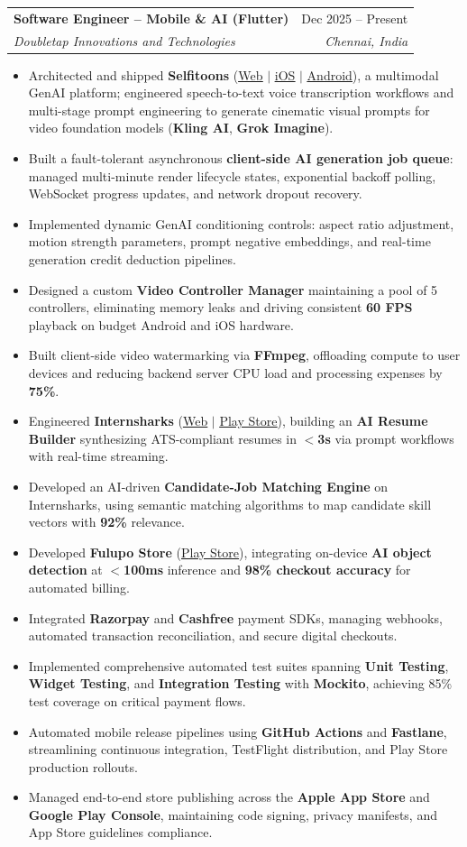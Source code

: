 \documentclass[letterpaper,10pt]{article}
\makeatletter
\newcommand{\resumeItem}[1]{
  \item\small{
    {#1 \vspace{-2pt}}
  }
}
\newcommand{\resumeSubheading}[4]{
  \vspace{-2pt}\item
    \begin{tabular*}{0.97\textwidth}[t]{l@{\extracolsep{\fill}}r}
      \textbf{#1} & #2 \\
      \textit{\small#3} & \textit{\small #4} \\
    \end{tabular*}\vspace{-6pt}
}
\newcommand{\resumeItemListStart}{\begin{itemize}[leftmargin=0.15in]}
\newcommand{\resumeItemListEnd}{\end{itemize}\vspace{-4pt}}
\makeatother
\begin{document}
    \resumeSubheading
      {Software Engineer -- Mobile \& AI (Flutter)}{Dec 2025 -- Present}
      {Doubletap Innovations and Technologies}{Chennai, India}
      \resumeItemListStart
        \resumeItem{Architected and shipped \textbf{Selfitoons} (\href{https://selfitoons.ai/}{\underline{Web}} $|$ \href{https://apps.apple.com/in/app/selfitoons/id6758597947}{\underline{iOS}} $|$ \href{https://play.google.com/store/apps/details?id=com.doubletap.ai.selfitoons}{\underline{Android}}), a multimodal GenAI platform; engineered speech-to-text voice transcription workflows and multi-stage prompt engineering to generate cinematic visual prompts for video foundation models (\textbf{Kling AI}, \textbf{Grok Imagine}).}
        \resumeItem{Built a fault-tolerant asynchronous \textbf{client-side AI generation job queue}: managed multi-minute render lifecycle states, exponential backoff polling, WebSocket progress updates, and network dropout recovery.}
        \resumeItem{Implemented dynamic GenAI conditioning controls: aspect ratio adjustment, motion strength parameters, prompt negative embeddings, and real-time generation credit deduction pipelines.}
        \resumeItem{Designed a custom \textbf{Video Controller Manager} maintaining a pool of 5 controllers, eliminating memory leaks and driving consistent \textbf{60 FPS} playback on budget Android and iOS hardware.}
        \resumeItem{Built client-side video watermarking via \textbf{FFmpeg}, offloading compute to user devices and reducing backend server CPU load and processing expenses by \textbf{75\%}.}
        \resumeItem{Engineered \textbf{Internsharks} (\href{https://internsharks.ai/}{\underline{Web}} $|$ \href{https://play.google.com/store/apps/details?id=com.doubletap.internsharks.ai}{\underline{Play Store}}), building an \textbf{AI Resume Builder} synthesizing ATS-compliant resumes in \textbf{$<$3s} via prompt workflows with real-time streaming.}
        \resumeItem{Developed an AI-driven \textbf{Candidate-Job Matching Engine} on Internsharks, using semantic matching algorithms to map candidate skill vectors with \textbf{92\%} relevance.}
        \resumeItem{Developed \textbf{Fulupo Store} (\href{https://play.google.com/store/apps/details?id=com.doubletap.fulupostore}{\underline{Play Store}}), integrating on-device \textbf{AI object detection} at \textbf{$<$100ms} inference and \textbf{98\% checkout accuracy} for automated billing.}
        \resumeItem{Integrated \textbf{Razorpay} and \textbf{Cashfree} payment SDKs, managing webhooks, automated transaction reconciliation, and secure digital checkouts.}
        \resumeItem{Implemented comprehensive automated test suites spanning \textbf{Unit Testing}, \textbf{Widget Testing}, and \textbf{Integration Testing} with \textbf{Mockito}, achieving 85\% test coverage on critical payment flows.}
        \resumeItem{Automated mobile release pipelines using \textbf{GitHub Actions} and \textbf{Fastlane}, streamlining continuous integration, TestFlight distribution, and Play Store production rollouts.}
        \resumeItem{Managed end-to-end store publishing across the \textbf{Apple App Store} and \textbf{Google Play Console}, maintaining code signing, privacy manifests, and App Store guidelines compliance.}
      \resumeItemListEnd
\end{document}
